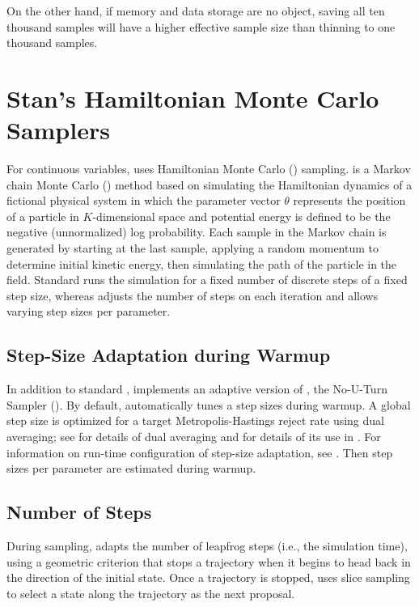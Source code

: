On the other hand, if memory and data storage are no object, saving all
ten thousand samples will have a higher effective sample size than
thinning to one thousand samples.

\section{Stan's Hamiltonian Monte Carlo Samplers}\label{intro-samplers.section}

For continuous variables, \Stan uses Hamiltonian Monte Carlo (\HMC)
sampling. \HMC is a Markov chain Monte Carlo (\MCMC) method based on
simulating the Hamiltonian dynamics of a fictional physical system in
which the parameter vector $\theta$ represents the position of a
particle in $K$-dimensional space and potential energy is defined to
be the negative (unnormalized) log probability.  Each sample in the
Markov chain is generated by starting at the last sample, applying a
random momentum to determine initial kinetic energy, then simulating
the path of the particle in the field.  Standard \HMC runs the
simulation for a fixed number of discrete steps of a fixed step size,
whereas \NUTS adjusts the number of steps on each iteration and allows
varying step sizes per parameter.



\subsection{Step-Size Adaptation during Warmup}

In addition to standard \HMC, \Stan implements an adaptive version of
\HMC, the No-U-Turn Sampler (\NUTS).  By default, \NUTS automatically
tunes a step sizes during warmup.  A global step size is optimized for
a target Metropolis-Hastings reject rate using dual averaging; see
\citep{Nesterov:2009} for details of dual averaging and
\citep{Hoffman-Gelman:2011,Hoffman-Gelman:2014} 
for details of its use in \Stan.  For
information on run-time configuration of step-size adaptation, see
.  Then step sizes per parameter
are estimated during warmup.  

\subsection{Number of Steps}

During sampling, \NUTS adapts the number of leapfrog steps (i.e., the
simulation time), using a geometric criterion that stops a trajectory
when it begins to head back in the direction of the initial state.
Once a trajectory is stopped, \NUTS uses slice sampling to select a
state along the trajectory as the next proposal.

